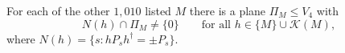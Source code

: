 For each of the other $1{,}010$ listed $M$ there is a plane $\Pi_M\le V_4$ with
\[
N(h)\cap\Pi_M\ne\{0\}\qquad\text{for all }h\in\{M\}\cup\mathcal K(M),
\]
where $N(h)=\{s:hP_sh^\dagger=\pm P_s\}$.
